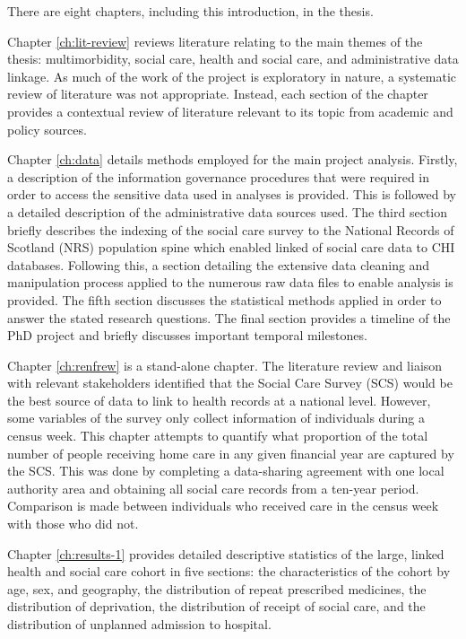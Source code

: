 \documentclass[12pt,a4paper,oneside,table]{report}
\begin{document}
There are eight chapters, including this introduction, in the thesis.

Chapter \ref{ch:lit-review} reviews literature relating to the main
themes of the thesis: multimorbidity, social care, health and social
care, and administrative data linkage. As much of the work of the
project is exploratory in nature, a systematic review of literature was
not appropriate. Instead, each section of the chapter provides a
contextual review of literature relevant to its topic from academic and
policy sources.

Chapter \ref{ch:data} details methods employed for the main project
analysis. Firstly, a description of the information governance
procedures that were required in order to access the sensitive data used
in analyses is provided. This is followed by a detailed description of
the administrative data sources used. The third section briefly
describes the indexing of the social care survey to the National Records
of Scotland (NRS) population spine which enabled linked of social care
data to CHI databases. Following this, a section detailing the extensive
data cleaning and manipulation process applied to the numerous raw data
files to enable analysis is provided. The fifth section discusses the
statistical methods applied in order to answer the stated research
questions. The final section provides a timeline of the PhD project and
briefly discusses important temporal milestones.

Chapter \ref{ch:renfrew} is a stand-alone chapter. The literature review
and liaison with relevant stakeholders identified that the Social Care
Survey (SCS) would be the best source of data to link to health records
at a national level. However, some variables of the survey only collect
information of individuals during a census week. This chapter attempts
to quantify what proportion of the total number of people receiving home
care in any given financial year are captured by the SCS. This was done
by completing a data-sharing agreement with one local authority area and
obtaining all social care records from a ten-year period. Comparison is
made between individuals who received care in the census week with those
who did not.

Chapter \ref{ch:results-1} provides detailed descriptive statistics of
the large, linked health and social care cohort in five sections: the
characteristics of the cohort by age, sex, and geography, the
distribution of repeat prescribed medicines, the distribution of
deprivation, the distribution of receipt of social care, and the
distribution of unplanned admission to hospital.
\end{document}
